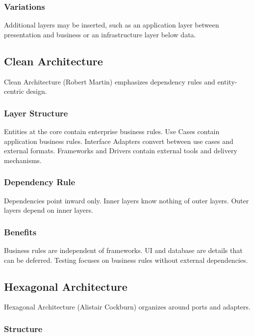 \documentclass[11pt]{article}
\begin{document}
\subsubsection{Variations}

Additional layers may be inserted, such as an application layer between presentation and business or an infrastructure layer below data.

\subsection{Clean Architecture}

Clean Architecture (Robert Martin) emphasizes dependency rules and entity-centric design.

\subsubsection{Layer Structure}

Entities at the core contain enterprise business rules. Use Cases contain application business rules. Interface Adapters convert between use cases and external formats. Frameworks and Drivers contain external tools and delivery mechanisms.

\subsubsection{Dependency Rule}

Dependencies point inward only. Inner layers know nothing of outer layers. Outer layers depend on inner layers.

\subsubsection{Benefits}

Business rules are independent of frameworks. UI and database are details that can be deferred. Testing focuses on business rules without external dependencies.

\subsection{Hexagonal Architecture}

Hexagonal Architecture (Alistair Cockburn) organizes around ports and adapters.

\subsubsection{Structure}
\end{document}
